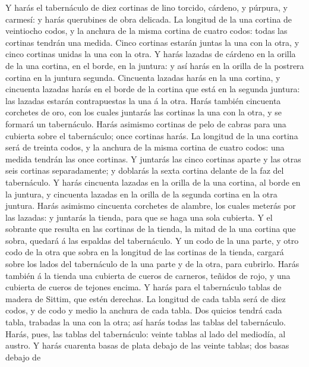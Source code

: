  Y harás el tabernáculo de diez cortinas de lino torcido,
cárdeno, y púrpura, y carmesí: y harás querubines de obra delicada.
 La longitud de la una cortina de veintiocho codos, y la
anchura de la misma cortina de cuatro codos: todas las cortinas tendrán
una medida.  Cinco cortinas estarán juntas la una con la
otra, y cinco cortinas unidas la una con la otra.  Y harás
lazadas de cárdeno en la orilla de la una cortina, en el borde, en la
juntura: y así harás en la orilla de la postrera cortina en la juntura
segunda.  Cincuenta lazadas harás en la una cortina, y
cincuenta lazadas harás en el borde de la cortina que está en la segunda
juntura: las lazadas estarán contrapuestas la una á la otra.
 Harás también cincuenta corchetes de oro, con los cuales
juntarás las cortinas la una con la otra, y se formará un tabernáculo.
 Harás asimismo cortinas de pelo de cabras para una cubierta
sobre el tabernáculo; once cortinas harás.  La longitud de
la una cortina será de treinta codos, y la anchura de la misma cortina
de cuatro codos: una medida tendrán las once cortinas.  Y
juntarás las cinco cortinas aparte y las otras seis cortinas
separadamente; y doblarás la sexta cortina delante de la faz del
tabernáculo.  Y harás cincuenta lazadas en la orilla de la
una cortina, al borde en la juntura, y cincuenta lazadas en la orilla de
la segunda cortina en la otra juntura.  Harás asimismo
cincuenta corchetes de alambre, los cuales meterás por las lazadas: y
juntarás la tienda, para que se haga una sola cubierta.  Y
el sobrante que resulta en las cortinas de la tienda, la mitad de la una
cortina que sobra, quedará á las espaldas del tabernáculo. 
Y un codo de la una parte, y otro codo de la otra que sobra en la
longitud de las cortinas de la tienda, cargará sobre los lados del
tabernáculo de la una parte y de la otra, para cubrirlo. 
Harás también á la tienda una cubierta de cueros de carneros, teñidos de
rojo, y una cubierta de cueros de tejones encima.  Y harás
para el tabernáculo tablas de madera de Sittim, que estén derechas.
 La longitud de cada tabla será de diez codos, y de codo y
medio la anchura de cada tabla.  Dos quicios tendrá cada
tabla, trabadas la una con la otra; así harás todas las tablas del
tabernáculo.  Harás, pues, las tablas del tabernáculo:
veinte tablas al lado del mediodía, al austro.  Y harás
cuarenta basas de plata debajo de las veinte tablas; dos basas debajo de
